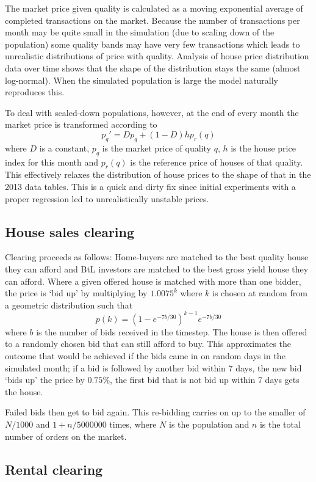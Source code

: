 \documentclass{report}
\begin{document}
The market price given quality is calculated as a moving exponential average of completed transactions on the market. Because the number of transactions per month may be quite small in the simulation (due to scaling down of the population) some quality bands may have very few transactions which leads to unrealistic distributions of price with quality. Analysis of house price distribution data over time shows that the shape of the distribution stays the same (almost log-normal). When the simulated population is large the model naturally reproduces this.

To deal with scaled-down populations, however, at the end of every month the market price is transformed according to
\[
p_q' = Dp_q + (1-D)hp_r(q)
\]
where $D$ is a constant, $p_q$ is the market price of quality $q$, $h$ is the house price index for this month and $p_r(q)$ is the reference price of houses of that quality. This effectively relaxes the distribution of house prices to the shape of that in the 2013 data tables. This is a quick and dirty fix since initial experiments with a proper regression led to unrealistically unstable prices.

\subsection{House sales clearing}

Clearing proceeds as follows: Home-buyers are matched to the best quality
house they can afford and BtL investors are matched to the best gross yield house they can afford. Where a given offered house is matched with more than one bidder, the price is `bid up' by multiplying by $1.0075^k$ where $k$ is chosen at random from a geometric distribution such that
\[
p(k) = (1-e^{-7b/30})^{k-1}e^{-7b/30}
\]
where $b$ is the number of bids received in the timestep. The house is then offered to a randomly chosen bid that can still afford to buy. This approximates the outcome that would be achieved if the bids came in on random days in the simulated month; if a bid is followed by another bid within 7 days, the new bid `bids up' the price by $0.75\%$, the first bid that is not bid up within 7 days gets the house.

Failed bids then get to bid again. This re-bidding carries on up to the smaller of $N/1000$ and $1+n/5000000$ times, where $N$ is the population and $n$ is the total number of orders on the market.

\subsection{Rental clearing}
\end{document}
